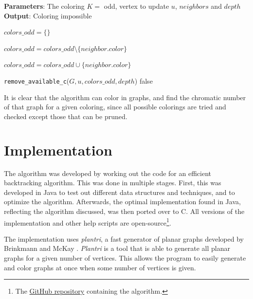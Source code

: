 \documentclass{article}
\begin{document}
\begin{algorithm}[tb]
	\caption{\texttt{handle\_special\_case\_odd}}
	\label{alg:special}
	\textbf{Parameters}: The coloring $K = $ odd, vertex to update $u$, $neighbors$ and $depth$ \\
	\textbf{Output}: Coloring impossible
	\begin{algorithmic}[1]
		\STATE $colors\_odd = \{\}$
		
		
		\STATE $colors\_odd = colors\_odd \setminus \{neighbor.color\}$
		
		\ELSE 
		
		\STATE $colors\_odd = colors\_odd \cup \{neighbor.color\}$
		\ENDIF
		
		\ENDFOR
		
		
		\RETURN \texttt{remove\_available\_c}($G, u, colors\_odd, depth$)
		\ENDIF
		\RETURN false
	\end{algorithmic}
\end{algorithm}

It is clear that the algorithm can color in graphs, and find the chromatic number of that graph for a given coloring, since all possible colorings are tried and checked except those that can be pruned.

\section{Implementation}
\label{sec:implementation}

The algorithm was developed by working out the code for an efficient backtracking algorithm. This was done in multiple stages. First, this was developed in Java to test out different data structures and techniques, and to optimize the algorithm. Afterwards, the optimal implementation found in Java, reflecting the algorithm discussed, was then ported over to C. All versions of the implementation and other help scripts are open-source\footnote{The \href{https://github.com/ArneClaerhout/color_planar_graphs}{GitHub repository} containing the algorithm.}.

The implementation uses \textit{plantri}, a fast generator of planar graphs developed by Brinkmann and McKay \cite{brinkmann2007fast}. \textit{Plantri} is a tool that is able to generate all planar graphs for a given number of vertices. This allows the program to easily generate and color graphs at once when some number of vertices is given. 
\end{document}
